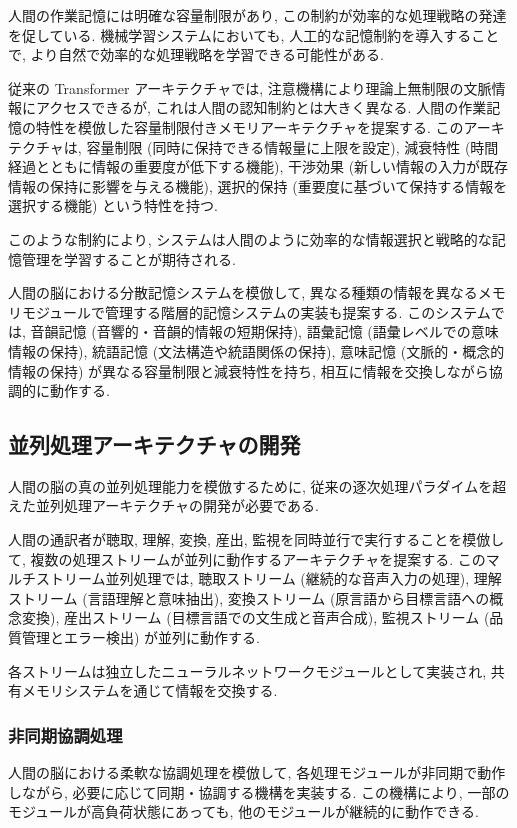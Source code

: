 人間の作業記憶には明確な容量制限があり, この制約が効率的な処理戦略の発達を促している.
機械学習システムにおいても, 人工的な記憶制約を導入することで, より自然で効率的な処理戦略を学習できる可能性がある.

従来の Transformer アーキテクチャでは, 注意機構により理論上無制限の文脈情報にアクセスできるが, これは人間の認知制約とは大きく異なる.
人間の作業記憶の特性を模倣した容量制限付きメモリアーキテクチャを提案する.
このアーキテクチャは, 容量制限 (同時に保持できる情報量に上限を設定), 減衰特性 (時間経過とともに情報の重要度が低下する機能), 干渉効果 (新しい情報の入力が既存情報の保持に影響を与える機能), 選択的保持 (重要度に基づいて保持する情報を選択する機能) という特性を持つ.

このような制約により, システムは人間のように効率的な情報選択と戦略的な記憶管理を学習することが期待される.

人間の脳における分散記憶システムを模倣して, 異なる種類の情報を異なるメモリモジュールで管理する階層的記憶システムの実装も提案する.
このシステムでは, 音韻記憶 (音響的・音韻的情報の短期保持), 語彙記憶 (語彙レベルでの意味情報の保持), 統語記憶 (文法構造や統語関係の保持), 意味記憶 (文脈的・概念的情報の保持) が異なる容量制限と減衰特性を持ち, 相互に情報を交換しながら協調的に動作する.

\subsection{並列処理アーキテクチャの開発}

人間の脳の真の並列処理能力を模倣するために, 従来の逐次処理パラダイムを超えた並列処理アーキテクチャの開発が必要である.

人間の通訳者が聴取, 理解, 変換, 産出, 監視を同時並行で実行することを模倣して, 複数の処理ストリームが並列に動作するアーキテクチャを提案する.
このマルチストリーム並列処理では, 聴取ストリーム (継続的な音声入力の処理), 理解ストリーム (言語理解と意味抽出), 変換ストリーム (原言語から目標言語への概念変換), 産出ストリーム (目標言語での文生成と音声合成), 監視ストリーム (品質管理とエラー検出) が並列に動作する.

各ストリームは独立したニューラルネットワークモジュールとして実装され, 共有メモリシステムを通じて情報を交換する.

\subsubsection{非同期協調処理}

人間の脳における柔軟な協調処理を模倣して, 各処理モジュールが非同期で動作しながら, 必要に応じて同期・協調する機構を実装する.
この機構により, 一部のモジュールが高負荷状態にあっても, 他のモジュールが継続的に動作できる.

